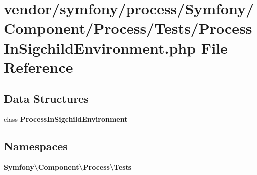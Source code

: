 \section{vendor/symfony/process/\+Symfony/\+Component/\+Process/\+Tests/\+Process\+In\+Sigchild\+Environment.php File Reference}
\label{_process_in_sigchild_environment_8php}
\subsection*{Data Structures}
\begin{DoxyCompactItemize}
\item 
class {\bf Process\+In\+Sigchild\+Environment}
\end{DoxyCompactItemize}
\subsection*{Namespaces}
\begin{DoxyCompactItemize}
\item 
 {\bf Symfony\textbackslash{}\+Component\textbackslash{}\+Process\textbackslash{}\+Tests}
\end{DoxyCompactItemize}
